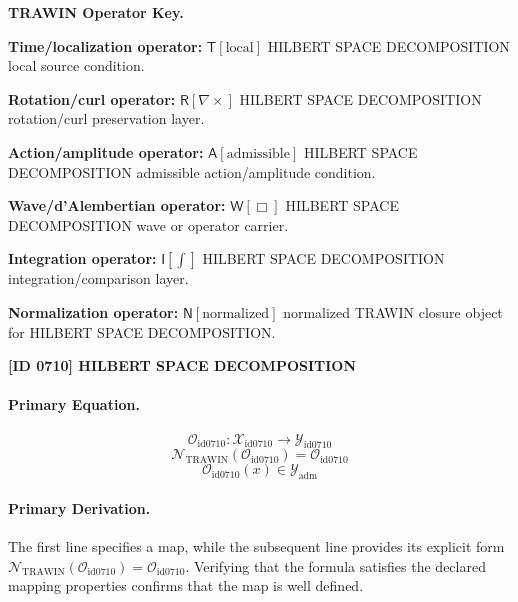 \par\vspace{0.45\baselineskip}
\noindent\begin{minipage}[t]{\linewidth}
\begingroup
\small
\raggedright
\textbf{TRAWIN Operator Key.}\par
\noindent\textbf{Time/localization operator:} $\mathsf{T}\!\left[\mathrm{local}\right]$ HILBERT SPACE DECOMPOSITION local source condition.\par
\noindent\textbf{Rotation/curl operator:} $\mathsf{R}\!\left[\nabla\times\right]$ HILBERT SPACE DECOMPOSITION rotation/curl preservation layer.\par
\noindent\textbf{Action/amplitude operator:} $\mathsf{A}\!\left[\mathrm{admissible}\right]$ HILBERT SPACE DECOMPOSITION admissible action/amplitude condition.\par
\noindent\textbf{Wave/d'Alembertian operator:} $\mathsf{W}\!\left[\Box\right]$ HILBERT SPACE DECOMPOSITION wave or operator carrier.\par
\noindent\textbf{Integration operator:} $\mathsf{I}\!\left[\int\right]$ HILBERT SPACE DECOMPOSITION integration/comparison layer.\par
\noindent\textbf{Normalization operator:} $\mathsf{N}\!\left[\mathrm{normalized}\right]$ normalized TRAWIN closure object for HILBERT SPACE DECOMPOSITION.\par
\endgroup
\end{minipage}

\clearpage
\noindent\textbf{[ID 0710] HILBERT SPACE DECOMPOSITION}\par
\vspace{0.35em}
\paragraph{Primary Equation.}
\[
\mathcal{O}_{\mathrm{id0710}}:\mathcal{X}_{\mathrm{id0710}}\longrightarrow\mathcal{Y}_{\mathrm{id0710}}
\]
\[
\mathcal{N}_{\mathrm{TRAWIN}}(\mathcal{O}_{\mathrm{id0710}})=\mathcal{O}_{\mathrm{id0710}}
\]
\[
\mathcal{O}_{\mathrm{id0710}}(x)\in\mathcal{Y}_{\mathrm{adm}}
\]

\paragraph{Primary Derivation.}
The first line specifies a map, while the subsequent line provides its explicit form \( \mathcal{N}_{\mathrm{TRAWIN}}(\mathcal{O}_{\mathrm{id0710}})=\mathcal{O}_{\mathrm{id0710}} \). Verifying that the formula satisfies the declared mapping properties confirms that the map is well defined.
